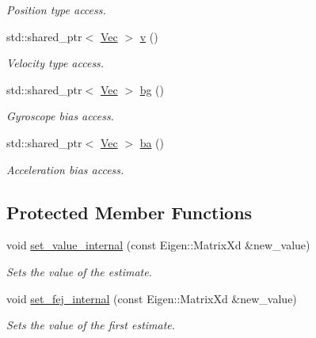 \begin{DoxyCompactItemize}
\begin{DoxyCompactList}\small\item\em Position type access. \end{DoxyCompactList}\item 
\mbox{\label{classov__type_1_1IMU_aacf93e0120b0b65e32d6163a7b0003ae}} 
std\+::shared\+\_\+ptr$<$ \hyperlink{classov__type_1_1Vec}{Vec} $>$ \hyperlink{classov__type_1_1IMU_aacf93e0120b0b65e32d6163a7b0003ae}{v} ()
\begin{DoxyCompactList}\small\item\em Velocity type access. \end{DoxyCompactList}\item 
\mbox{\label{classov__type_1_1IMU_a197df0137b205d1de56e89633ffdb03e}} 
std\+::shared\+\_\+ptr$<$ \hyperlink{classov__type_1_1Vec}{Vec} $>$ \hyperlink{classov__type_1_1IMU_a197df0137b205d1de56e89633ffdb03e}{bg} ()
\begin{DoxyCompactList}\small\item\em Gyroscope bias access. \end{DoxyCompactList}\item 
\mbox{\label{classov__type_1_1IMU_abed8b317325773478f1326ee82152eb9}} 
std\+::shared\+\_\+ptr$<$ \hyperlink{classov__type_1_1Vec}{Vec} $>$ \hyperlink{classov__type_1_1IMU_abed8b317325773478f1326ee82152eb9}{ba} ()
\begin{DoxyCompactList}\small\item\em Acceleration bias access. \end{DoxyCompactList}\end{DoxyCompactItemize}
\subsection*{Protected Member Functions}
\begin{DoxyCompactItemize}
\item 
void \hyperlink{classov__type_1_1IMU_a044e09e82a734c3e0fe5f54748c40db6}{set\+\_\+value\+\_\+internal} (const Eigen\+::\+Matrix\+Xd \&new\+\_\+value)
\begin{DoxyCompactList}\small\item\em Sets the value of the estimate. \end{DoxyCompactList}\item 
void \hyperlink{classov__type_1_1IMU_a5227146c3f4edef484cb2c9beb349a3f}{set\+\_\+fej\+\_\+internal} (const Eigen\+::\+Matrix\+Xd \&new\+\_\+value)
\begin{DoxyCompactList}\small\item\em Sets the value of the first estimate. \end{DoxyCompactList}\end{DoxyCompactItemize}
